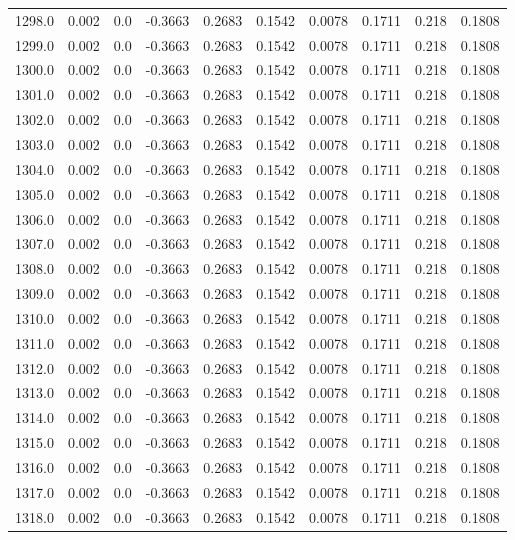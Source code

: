 \begin{longtable}{lrrrrrrrrr}
1298.0 & 0.002 & 0.0 & -0.3663 & 0.2683 & 0.1542 & 0.0078 & 0.1711 & 0.218 & 0.1808 \\
1299.0 & 0.002 & 0.0 & -0.3663 & 0.2683 & 0.1542 & 0.0078 & 0.1711 & 0.218 & 0.1808 \\
1300.0 & 0.002 & 0.0 & -0.3663 & 0.2683 & 0.1542 & 0.0078 & 0.1711 & 0.218 & 0.1808 \\
1301.0 & 0.002 & 0.0 & -0.3663 & 0.2683 & 0.1542 & 0.0078 & 0.1711 & 0.218 & 0.1808 \\
1302.0 & 0.002 & 0.0 & -0.3663 & 0.2683 & 0.1542 & 0.0078 & 0.1711 & 0.218 & 0.1808 \\
1303.0 & 0.002 & 0.0 & -0.3663 & 0.2683 & 0.1542 & 0.0078 & 0.1711 & 0.218 & 0.1808 \\
1304.0 & 0.002 & 0.0 & -0.3663 & 0.2683 & 0.1542 & 0.0078 & 0.1711 & 0.218 & 0.1808 \\
1305.0 & 0.002 & 0.0 & -0.3663 & 0.2683 & 0.1542 & 0.0078 & 0.1711 & 0.218 & 0.1808 \\
1306.0 & 0.002 & 0.0 & -0.3663 & 0.2683 & 0.1542 & 0.0078 & 0.1711 & 0.218 & 0.1808 \\
1307.0 & 0.002 & 0.0 & -0.3663 & 0.2683 & 0.1542 & 0.0078 & 0.1711 & 0.218 & 0.1808 \\
1308.0 & 0.002 & 0.0 & -0.3663 & 0.2683 & 0.1542 & 0.0078 & 0.1711 & 0.218 & 0.1808 \\
1309.0 & 0.002 & 0.0 & -0.3663 & 0.2683 & 0.1542 & 0.0078 & 0.1711 & 0.218 & 0.1808 \\
1310.0 & 0.002 & 0.0 & -0.3663 & 0.2683 & 0.1542 & 0.0078 & 0.1711 & 0.218 & 0.1808 \\
1311.0 & 0.002 & 0.0 & -0.3663 & 0.2683 & 0.1542 & 0.0078 & 0.1711 & 0.218 & 0.1808 \\
1312.0 & 0.002 & 0.0 & -0.3663 & 0.2683 & 0.1542 & 0.0078 & 0.1711 & 0.218 & 0.1808 \\
1313.0 & 0.002 & 0.0 & -0.3663 & 0.2683 & 0.1542 & 0.0078 & 0.1711 & 0.218 & 0.1808 \\
1314.0 & 0.002 & 0.0 & -0.3663 & 0.2683 & 0.1542 & 0.0078 & 0.1711 & 0.218 & 0.1808 \\
1315.0 & 0.002 & 0.0 & -0.3663 & 0.2683 & 0.1542 & 0.0078 & 0.1711 & 0.218 & 0.1808 \\
1316.0 & 0.002 & 0.0 & -0.3663 & 0.2683 & 0.1542 & 0.0078 & 0.1711 & 0.218 & 0.1808 \\
1317.0 & 0.002 & 0.0 & -0.3663 & 0.2683 & 0.1542 & 0.0078 & 0.1711 & 0.218 & 0.1808 \\
1318.0 & 0.002 & 0.0 & -0.3663 & 0.2683 & 0.1542 & 0.0078 & 0.1711 & 0.218 & 0.1808 \\

\end{longtable}

